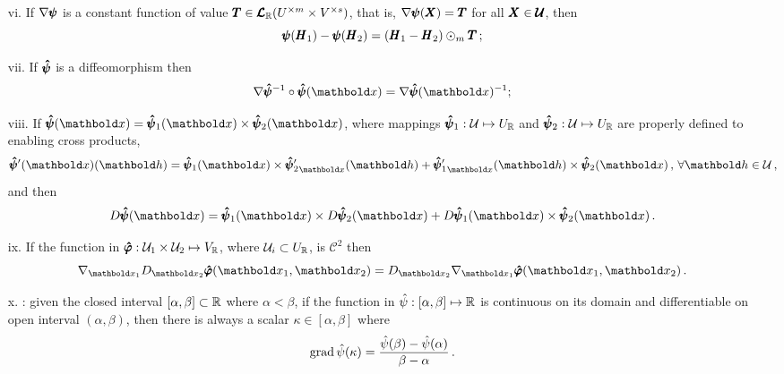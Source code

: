 \begin{itemize}
\begin{equation}
	\end{equation}
	\item[vi.] If $\nabla\pmb{\psi}$ is a constant function of value $\pmb{T}\in\pmb{\mathcal{L}}_{\mathbb{R}}(U^{\times m}\times V^{\times s})$, that is, $\nabla\pmb{\psi}(\pmb{X})=\pmb{T}$ for all $\pmb{X}\in\pmb{\mathcal{U}}$, then 
	\begin{equation}\label{eq:gradConst}
	\pmb{\psi}(\pmb{H}_1)-\pmb{\psi}(\pmb{H}_2)=(\pmb{H}_1-\pmb{H}_2)\odot_m\pmb{T}\,;
	\end{equation}
	\item[vii.] If $\pmb{\hat\psi}$ is a diffeomorphism then 
	\begin{equation}\label{eq:gradDiffeo2}
	\fua{\nabla\tnr{\hat\psi}^{-1}\circ\tnr{\hat\psi}}{\vto{x}}=\fua{\nabla\tnr{\hat\psi}}{\vto{x}}^{-1};
	\end{equation}
	\item[viii.] If $\fua{\tnr{\hat\psi}}{\vto{x}}=\fua{\tnr{\hat\psi}_1}{\vto{x}}\times\fua{\tnr{\hat\psi}_2}{\vto{x}}$, where mappings  $\pmb{\hat\psi}_1 : {\mathcal{U}} \mapsto U_{\mathbb{R}}$ and $\pmb{\hat\psi}_2 : {\mathcal{U}} \mapsto U_{\mathbb{R}}$ are properly defined to enabling cross products, 
\begin{equation}\label{eq:crossRule}
\fua{\tnr{\hat\psi}'(\vto{x})}{\vto{h}} = \fua{\tnr{\hat\psi}_1}{\vto{x}}\times\fua{{\tnr{\hat\psi}_2'}_{\vto{x}}}{\vto{h}} + \fua{{\tnr{\hat\psi}_1'}_{\vto{x}}}{\vto{h}} \times \fua{\tnr{\hat\psi}_2}{\vto{x}}\,,\,\forall \vto{h}\in\mathcal{U}\,,
\end{equation}
and then 
	\begin{equation}\label{eq:prop3Grad}
	\fua{D\tnr{\hat\psi}}{\vto{x}} = \fua{\tnr{\hat\psi}_1}{\vto{x}}\times\fua{D\tnr{\hat\psi}_2}{\vto{x}}+\fua{D\tnr{\hat\psi}_1}{\vto{x}}\times\fua{\tnr{\hat\psi}_2}{\vto{x}}\,.
	\end{equation}
	\item[ix.] If the function in $\pmb{\hat{\varphi}} : {\mathcal{U}}_1\times{\mathcal{U}}_2 \mapsto V_{\mathbb{R}}$, where ${\mathcal{U}}_i\subset U_{\mathbb{R}}$, is $\mathcal{C}^2$ then
\begin{equation}\label{eq:gradCommute}
\nabla_{\vto{x}_1}D_{\vto{x}_2}\tnr{\hat{\varphi}}(\vto{x}_1,\vto{x}_2)=D_{\vto{x}_2}\nabla_{\vto{x}_1}\tnr{\hat{\varphi}}(\vto{x}_1,\vto{x}_2)\,.
\end{equation}

\item[x.] : given the closed interval $[\alpha,\beta]\subset\mathbb{R}$ where $\alpha<\beta$, if the function in $\hat{\psi} : [\alpha,\beta] \mapsto \mathbb{R}$ is continuous on its domain and differentiable on open interval $(\alpha,\beta)$, then there is always a scalar $\kappa\in[\alpha,\beta]$ where
\begin{equation}\label{eq:meanValue}
\operatorname{grad}{{\hat{\psi}}(\kappa)} =\dfrac{\hat{\psi}(\beta)-\hat{\psi}(\alpha)}{\beta-\alpha}\,.
\end{equation}


\end{itemize}
